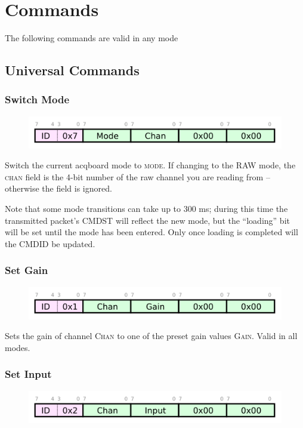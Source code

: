 \section{Commands}

The following commands are valid in any mode

\subsection{Universal Commands}

\subsubsection{Switch Mode}
\begin{figure}[h!]
\includegraphics[scale=1.5]{switchmode.cmd.svg}
\end{figure}

Switch the current acqboard mode to \textsc{mode}. If changing to the RAW mode, the \textsc{chan} field is the 4-bit number of the raw channel you are reading from -- otherwise the field is ignored. 

Note that some mode transitions can take up to 300 ms; during this time the transmitted packet's CMDST will reflect the new mode, but the ``loading'' bit will be set until the mode has been entered. Only once loading is completed will the CMDID be updated. 

\subsubsection{Set Gain}
\begin{figure}[h!]
\includegraphics[scale=1.5]{setgain.cmd.svg}
\end{figure}

Sets the gain of channel \textsc{Chan} to one of the preset gain values \textsc{Gain}. Valid in all modes. 

\subsubsection{Set Input}
\begin{figure}[h!]
\includegraphics[scale=1.5]{setinput.cmd.svg}
\end{figure}

